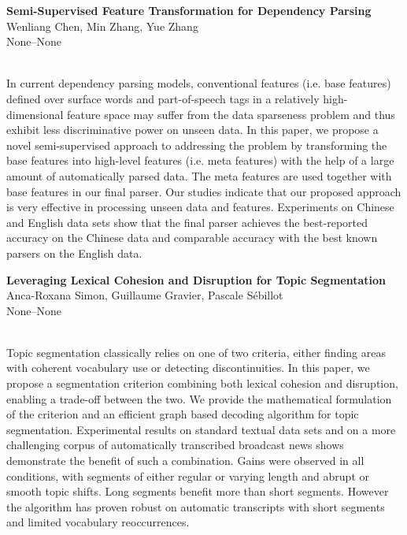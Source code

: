 \documentclass[twoside,makeidx]{book}
\renewcommand{\normalsize}{\fontsize{8}{9}\selectfont}
\renewcommand{\small}{\fontsize{7}{8}\selectfont}
\begin{document}
\par\vspace{2em}\noindent%
\begin{minipage}{\linewidth}%
\begin{center}
\textbf{\normalsize Semi-Supervised Feature Transformation for Dependency Parsing}\\
\normalsize  Wenliang Chen,  Min Zhang,  Yue Zhang\\
{\small None--None}\\
\end{center}
\end{minipage}\\[0.5em]
\nopagebreak%
\noindent%
{\small In current dependency parsing models, conventional features (i.e. base features) defined over surface words and part-of-speech tags in a relatively high-dimensional feature space may suffer from the data sparseness problem and thus exhibit less discriminative power on unseen data. In this paper, we propose a novel semi-supervised approach to addressing the problem by transforming the base features into high-level features (i.e. meta features) with the help of a large amount of automatically parsed data. The meta features are used together with base features in our final parser. Our studies indicate that our proposed approach is very effective in processing unseen data and features. Experiments on Chinese and English data sets show that the final parser achieves the best-reported accuracy on the Chinese data and comparable accuracy with the best known parsers on the English data.}
\par\vspace{2em}\noindent%
\begin{minipage}{\linewidth}%
\begin{center}
\textbf{\normalsize Leveraging Lexical Cohesion and Disruption for Topic Segmentation}\\
\normalsize  Anca-Roxana Simon,  Guillaume Gravier,  Pascale S\'{e}billot\\
{\small None--None}\\
\end{center}
\end{minipage}\\[0.5em]
\nopagebreak%
\noindent%
{\small Topic segmentation classically relies on one of two criteria, either finding areas with coherent vocabulary use or detecting discontinuities. In this paper, we propose a segmentation criterion combining both lexical cohesion and disruption, enabling a trade-off between the two. We provide the mathematical formulation of the criterion and an efficient graph based decoding algorithm for topic segmentation. Experimental results on standard textual data sets and on a more challenging corpus of automatically transcribed broadcast news shows demonstrate the benefit of such a combination. Gains were observed in all conditions, with segments of either regular or varying length and abrupt or smooth topic shifts. Long segments benefit more than short segments. However the algorithm has proven robust on automatic transcripts with short segments and limited vocabulary reoccurrences.}
\end{document}
